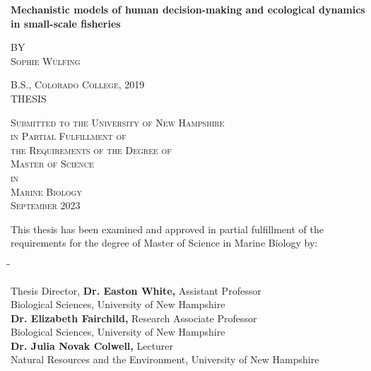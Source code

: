 \documentclass[
  12pt,
]{article}
\author{}
\date{\vspace{-2.5em}}
\begin{document}
\doublespacing


\begin{center}
    
\textbf{\Large Mechanistic models of human decision-making and ecological dynamics in small-scale fisheries}
    
\textsc{BY \\ Sophie Wulfing}
\vspace{3 mm}

\textsc{B.S., Colorado College, 2019 \\ }
\vspace{3 mm}
\textsc{THESIS}

\vspace{3 mm}
\textsc{Submitted to the University of New Hampshire \\ in Partial Fulfillment of \\ the Requirements of the Degree of \\ Master of Science \\ in \\ Marine Biology \\ September 2023}

\end{center}

\thispagestyle{empty}

\newpage

This thesis has been examined and approved in partial fulfillment of the requirements for the
degree of Master of Science in Marine Biology by:

\vspace{3.5 mm}

\begin{tabbing}

\hspace{30pt}\=\hspace{30pt}\=\kill

\> Thesis Director, \textbf{Dr. Easton White,} Assistant Professor  \\
\> Biological Sciences, University of New Hampshire  \\
\> \textbf{Dr. Elizabeth Fairchild,} Research Associate Professor \\
\> Biological Sciences, University of New Hampshire  \\
\> \textbf{Dr. Julia Novak Colwell,} Lecturer  \\
\> Natural Resources and the Environment, University of New Hampshire \\

\end{tabbing}
\end{document}
